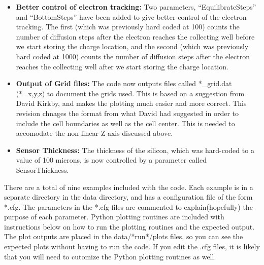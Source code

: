 \documentclass{article} %
\makeatletter
\def\section{\@startsection {section}{1}{\z@}{1.0ex plus
1ex minus .2ex}{.2ex plus .2ex}{\large\bf}}
\makeatother
\begin{document}
\begin{itemize}
  \item {\bf Better control of electron tracking:} Two parameters, ``EquilibrateSteps'' and ``BottomSteps'' have been added to give better control of the electron tracking.  The first (which was previously hard coded at 100) counts the number of diffusion steps after the electron reaches the collecting well before we start storing the charge location, and the second (which was previously hard coded at 1000) counts the number of diffusion steps after the electron reaches the collecting well after we start storing the charge location.

    \item {\bf Output of Grid files:} The code now outputs files called *\_grid.dat (*=x,y,z) to document the grids used.  This is based on a suggestion from David Kirkby, and makes the plotting much easier and more correct.  This revision
chnages the format from what David had suggested in order to include the cell boundaries as well as the cell center.  This is needed to accomodate the non-linear Z-axis discussed above.

\item {\bf Sensor Thickness:} The thickness of the silicon, which was hard-coded to a value of 100 microns, is now controlled by a parameter called SensorThickness.

\end{itemize}

\section{Examples}

There are a total of nine examples included with the code.  Each example is in a separate directory in the data directory, and has a configuration file of the form *.cfg. The parameters in the *.cfg files are commented to explain(hopefully) the purpose of each parameter. Python plotting routines are included with instructions below on how to run the plotting routines and the expected output.  The plot outputs are placed in the data/*run*/plots files, so you can see the expected plots without having to run the code.  If you edit the .cfg files, it is likely that you will need to cutomize the Python plotting routines as well.
\end{document}
